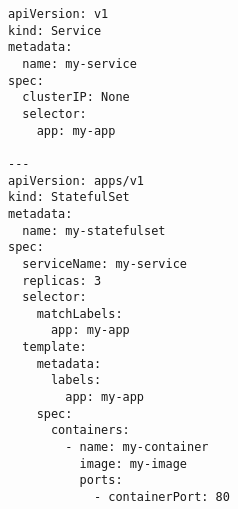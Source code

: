 \begin{verbatim}
apiVersion: v1
kind: Service
metadata:
  name: my-service
spec:
  clusterIP: None
  selector:
    app: my-app

---
apiVersion: apps/v1
kind: StatefulSet
metadata:
  name: my-statefulset
spec:
  serviceName: my-service
  replicas: 3
  selector:
    matchLabels:
      app: my-app
  template:
    metadata:
      labels:
        app: my-app
    spec:
      containers:
        - name: my-container
          image: my-image
          ports:
            - containerPort: 80
\end{verbatim}